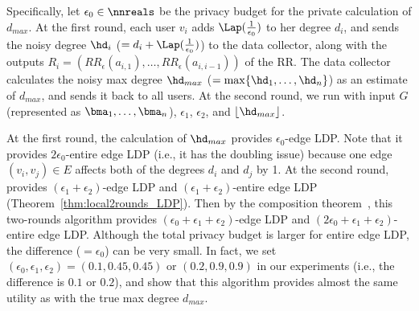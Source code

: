 Specifically, let $\epsilon_0 \in \nnreals$ be the privacy budget for the private calculation of $d_{max}$. 
At the first round, each user $v_i$ adds $\Lap(\frac{1}{\epsilon_0})$ to her degree $d_i$, 
and sends the noisy degree $\hd_i$ ($=d_i + \Lap(\frac{1}{\epsilon_0})$) to the data collector, along with the outputs $R_i = (RR_\epsilon(a_{i,1}), \ldots, RR_\epsilon(a_{i,i-1}))$ of the RR. 
The data collector calculates the noisy max degree $\hd_{max}$ ($= \max\{\hd_1,
\ldots, \hd_n\}$) as an estimate of $d_{max}$, and sends it back to all users. 
At the second round, we run  with input $G$ (represented as $\bma_1, \ldots, \bma_n$), $\epsilon_1$, $\epsilon_2$, and $\lfloor \hd_{max} \rfloor$. 


At the first round, the calculation of $\hd_{max}$ provides $\epsilon_0$-edge LDP. 
Note that it provides $2\epsilon_0$-entire edge LDP (i.e., it has the doubling issue) because one edge $(v_i,v_j) \in E$ affects both of the degrees $d_i$ and $d_j$ by 1. 
At the second round,  provides $(\epsilon_1 + \epsilon_2)$-edge LDP and 
$(\epsilon_1 + \epsilon_2)$-entire edge LDP (Theorem~\ref{thm:local2rounds_LDP}). 
Then by the composition theorem~\cite{DP}, this two-rounds algorithm provides $(\epsilon_0 + \epsilon_1 + \epsilon_2)$-edge LDP and $(2\epsilon_0 + \epsilon_1 + \epsilon_2)$-entire edge LDP. 
Although the total privacy budget is larger for entire edge LDP, the difference ($=\epsilon_0$) can be very small. 
In fact, we set $(\epsilon_0, \epsilon_1, \epsilon_2) = (0.1, 0.45, 0.45)$ or $(0.2, 0.9, 0.9)$ in our experiments (i.e., the difference is $0.1$ or $0.2$), and show that this algorithm provides almost the same utility as  with the true max degree $d_{max}$. 

